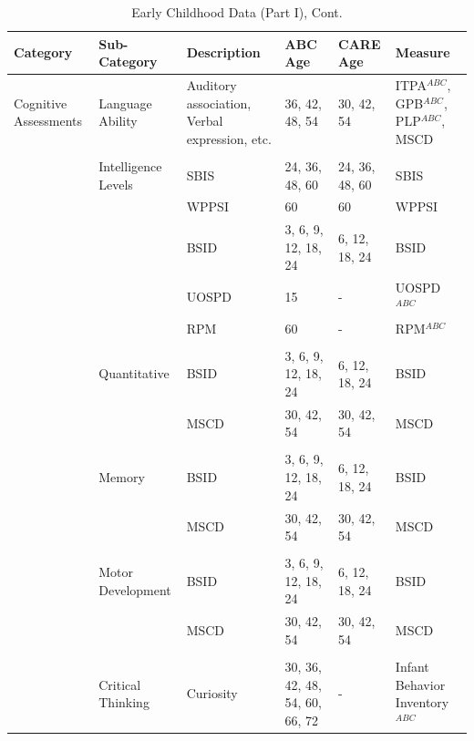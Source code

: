 \documentclass[static]{JJH-Beamer}
\begin{document}
\begin{frame}[shrink=5]

\begin{table}[H]
\addtocounter{table}{-1}
\caption{Early Childhood Data (Part I), Cont.}
\begin{center}
\begin{tiny}
\begin{tabular}{L{1.4cm} C{2cm} C{1.5cm} C{1.3cm} C{1.3cm}  C{2cm}}
\toprule
\textbf{Category}	&	\textbf{Sub-Category}	&	\textbf{Description}	&	\textbf{ABC Age}  	&  \textbf{CARE Age}  & 	\textbf{Measure}	\\ \midrule
Cognitive Assessments	&	Language Ability	&	Auditory association, Verbal expression, etc. 	&	36, 42, 48, 54	&	30, 42, 54	&	ITPA$^{ABC}$, GPB$^{ABC}$, PLP$^{ABC}$, MSCD \\
	&	\\
	&	Intelligence Levels	&	SBIS 	&	24, 36, 48, 60	&	24, 36, 48, 60	&	SBIS	\\
	&		&	WPPSI	&	60	&	60	&	WPPSI	\\
	&		&	BSID 	&	3, 6, 9, 12, 18, 24	&	6, 12, 18, 24		&	BSID	\\
	&		&	UOSPD	&	15	&	- 	&	UOSPD$^{ABC}$	\\
	&		&	RPM	&	60	&	-	&	RPM$^{ABC}$	\\
	&	\\
	&	Quantitative	 &	BSID 	&	3, 6, 9, 12, 18, 24	&	6, 12, 18, 24		&	BSID	\\
	&		&	MSCD 	&	30, 42, 54		&	30, 42, 54	&	MSCD	\\
	&	\\
	&	Memory	&	BSID 	&	3, 6, 9, 12, 18, 24	& 	6, 12, 18, 24		&	BSID	\\
	&		&	MSCD 	&	30, 42, 54	&	30, 42, 54	&	MSCD	\\
	&	\\
	&	Motor Development	&	BSID 	&	3, 6, 9, 12, 18, 24	&	6, 12, 18, 24		&	BSID\\
	&		&	MSCD 	&	30, 42, 54	&	30, 42, 54	&	MSCD	\\
	& 	\\
	&	Critical Thinking	&	Curiosity	&	30, 36, 42, 48, 54, 60, 66, 72	& - &	Infant Behavior Inventory$^{ABC}$	\\
\bottomrule
\end{tabular}
\end{tiny}
\end{center}
\end{table}

\end{frame}
\end{document}
